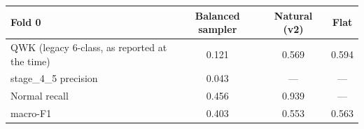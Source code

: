 \begin{tabular}{@{}>{\raggedright\arraybackslash}p{2.7cm}ccc@{}}
\toprule
Fold 0 & Balanced sampler & Natural (v2) & Flat\\
\midrule
QWK (legacy 6-class, as reported at the time) & 0.121 & 0.569 & 0.594 \\
stage\_4\_5 precision & 0.043 & --- & --- \\
Normal recall & 0.456 & 0.939 & --- \\
macro-F1 & 0.403 & 0.553 & 0.563 \\
\bottomrule
\end{tabular}
